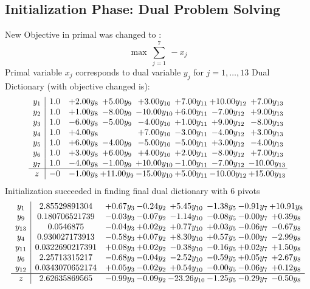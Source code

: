 \documentclass[9pt]{article}
\begin{document}
\subsection{Initialization Phase: Dual Problem Solving}
New Objective in primal was changed to : \[ \max\ \sum_{j=1}^{7}\ - x_j \] 
Primal variable $x_j$ corresponds to dual variable $y_j$ for $j = 1,\ldots,13$
Dual Dictionary (with objective changed is): 
\[\begin{array}{c| c c@{\hskip 2pt} c@{\hskip 2pt} c@{\hskip 2pt} c@{\hskip 2pt} c@{\hskip 2pt} c@{\hskip 2pt} }
 y_{1}   &  1.0 & +  2.00 y_{8} & +  5.00 y_{9} & +  3.00 y_{10} & +  7.00 y_{11} & + 10.00 y_{12} & +  7.00 y_{13}\\
 y_{2}   &  1.0 & +  1.00 y_{8} & -8.00 y_{9} & -10.00 y_{10} & +  6.00 y_{11} & -7.00 y_{12} & +  9.00 y_{13}\\
 y_{3}   &  1.0 & -6.00 y_{8} & -5.00 y_{9} & -4.00 y_{10} & +  1.00 y_{11} & +  9.00 y_{12} & -8.00 y_{13}\\
 y_{4}   &  1.0 & +  4.00 y_{8} &   & +  7.00 y_{10} & -3.00 y_{11} & -4.00 y_{12} & +  3.00 y_{13}\\
 y_{5}   &  1.0 & +  6.00 y_{8} & -4.00 y_{9} & -5.00 y_{10} & -5.00 y_{11} & +  3.00 y_{12} & -4.00 y_{13}\\
 y_{6}   &  1.0 & +  3.00 y_{8} & +  6.00 y_{9} & +  4.00 y_{10} & +  2.00 y_{11} & -8.00 y_{12} & +  7.00 y_{13}\\
 y_{7}   &  1.0 & -4.00 y_{8} & -1.00 y_{9} & + 10.00 y_{10} & -1.00 y_{11} & -7.00 y_{12} & -10.00 y_{13}\\
\hline
z    &  -0 & -1.00 y_{8} & + 11.00 y_{9} & -15.00 y_{10} & +  5.00 y_{11} & -10.00 y_{12} & + 15.00 y_{13}\\
\end{array}\]
Initialization succeeded in finding final dual dictionary with 6 pivots
\[\begin{array}{c| c c@{\hskip 2pt} c@{\hskip 2pt} c@{\hskip 2pt} c@{\hskip 2pt} c@{\hskip 2pt} c@{\hskip 2pt} }
 y_{1}   &  2.85529891304 & +  0.67 y_{3} & -0.24 y_{2} & +  5.45 y_{10} & -1.38 y_{5} & -0.91 y_{7} & + 10.91 y_{8}\\
 y_{9}   &  0.180706521739 & -0.03 y_{3} & -0.07 y_{2} & -1.14 y_{10} & -0.08 y_{5} & -0.00 y_{7} & +  0.39 y_{8}\\
 y_{13}   &  0.0546875 & -0.04 y_{3} & +  0.02 y_{2} & +  0.77 y_{10} & +  0.03 y_{5} & -0.06 y_{7} & -0.67 y_{8}\\
 y_{4}   &  0.930027173913 & -0.58 y_{3} & +  0.07 y_{2} & +  8.30 y_{10} & +  0.57 y_{5} & -0.00 y_{7} & -2.99 y_{8}\\
 y_{11}   &  0.0322690217391 & +  0.08 y_{3} & +  0.02 y_{2} & -0.38 y_{10} & -0.16 y_{5} & +  0.02 y_{7} & +  1.50 y_{8}\\
 y_{6}   &  2.25713315217 & -0.68 y_{3} & -0.04 y_{2} & -2.52 y_{10} & -0.59 y_{5} & +  0.05 y_{7} & +  2.67 y_{8}\\
 y_{12}   &  0.0343070652174 & +  0.05 y_{3} & -0.02 y_{2} & +  0.54 y_{10} & -0.00 y_{5} & -0.06 y_{7} & +  0.12 y_{8}\\
\hline
z    &  2.62635869565 & -0.99 y_{3} & -0.09 y_{2} & -23.26 y_{10} & -1.25 y_{5} & -0.29 y_{7} & -0.50 y_{8}\\
\end{array}\]
\end{document}
